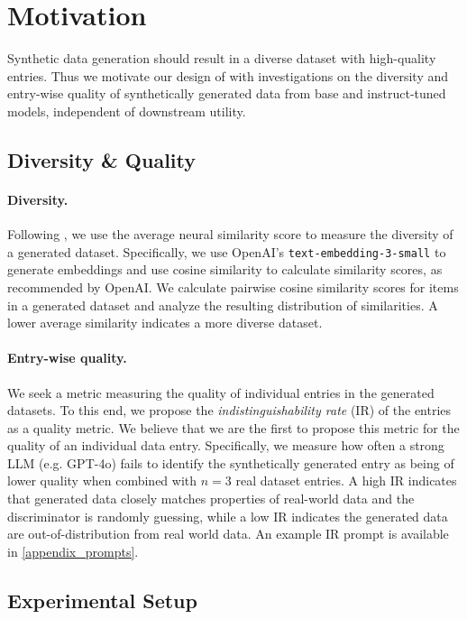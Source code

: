 \section{Motivation}
\label{motivation}

Synthetic data generation should result in a diverse dataset with high-quality entries. Thus we motivate our design of \Sys{} with investigations on the diversity and entry-wise quality of synthetically generated data from base and instruct-tuned models, independent of downstream utility.

\subsection{Diversity \& Quality}
\label{diversity-experiments}

\paragraph{Diversity.} Following \citet{tevet-berant-2021-evaluating}, we use the average neural similarity score to measure the diversity of a generated dataset. Specifically, we use OpenAI's \texttt{text-embedding-3-small} \cite{openai2024embedding} to generate embeddings and use cosine similarity to calculate similarity scores, as recommended by OpenAI. We calculate pairwise cosine similarity scores for items in a generated dataset and analyze the resulting distribution of similarities. A lower average similarity indicates a more diverse dataset.

\paragraph{Entry-wise quality.} We seek a metric measuring the quality of individual entries in the generated datasets. To this end, we propose the \textit{indistinguishability rate} (IR) of the entries as a quality metric. We believe that we are the first to propose this metric for the quality of an individual data entry. Specifically, we measure how often a strong LLM (e.g. GPT-4o) fails to identify the synthetically generated entry as being of lower quality when combined with $n=3$ real dataset entries. A high IR indicates that generated data closely matches properties of real-world data and the discriminator is randomly guessing, while a low IR indicates the generated data are out-of-distribution from real world data. An example IR prompt is available in \cref{appendix_prompts}.

\subsection{Experimental Setup}

